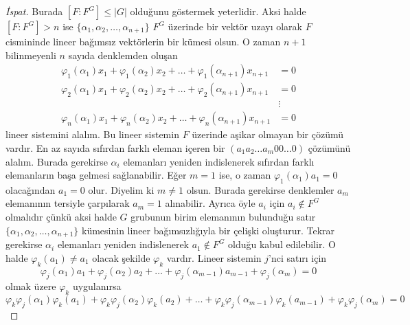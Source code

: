 \documentclass[draft]{article}
\theoremstyle{definition}
\theoremstyle{remark}
\newcommand{\envert}[1]{\left\lvert#1\right\rvert}
\let\abs=\envert
\begin{document}
    		\begin{proof}[İspat]
    	        Burada $[F : F^G] \leq \abs{G}$ olduğunu göstermek yeterlidir. Aksi halde $[F : F^G] > n$ ise $\{\alpha_1, \alpha_2, \dots, \alpha_{n + 1}\}$ $F^G$ üzerinde bir vektör uzayı olarak $F$ cismininde lineer bağımsız vektörlerin bir kümesi olsun. O zaman $n + 1$ bilinmeyenli $n$ sayıda denklemden oluşan
    	        \begin{align*}
    	            \varphi_1(\alpha_1)x_1 + \varphi_1(\alpha_2)x_2 + \dots + \varphi_1(\alpha_{n + 1})x_{n + 1} &= 0\\
    	            \varphi_2(\alpha_1)x_1 + \varphi_2(\alpha_2)x_2 + \dots + \varphi_2(\alpha_{n + 1})x_{n + 1} &= 0\\
    	            &\vdots\\
    	            \varphi_n(\alpha_1)x_1 + \varphi_n(\alpha_2)x_2 + \dots + \varphi_n(\alpha_{n + 1})x_{n + 1} &= 0
    	        \end{align*}
    	        lineer sistemini alalım. Bu lineer sistemin $F$ üzerinde aşikar olmayan bir çözümü vardır. En az sayıda sıfırdan farklı eleman içeren bir $(a_1 a_2 \dots a_m 0 0 \dots 0)$ çözümünü alalım. Burada gerekirse $\alpha_i$ elemanları yeniden indislenerek sıfırdan farklı elemanların başa gelmesi sağlanabilir. Eğer $m = 1$ ise, o zaman $\varphi_1(\alpha_1)a_1 = 0$ olacağından $a_1 = 0$ olur. Diyelim ki $m \neq 1$ olsun. Burada gerekirse denklemler $a_m$ elemanının tersiyle çarpılarak $a_m = 1$ alınabilir. Ayrıca öyle $a_i$ için $a_i \notin F^G$ olmalıdır çünkü aksi halde $G$ grubunun birim elemanının bulunduğu satır $\{\alpha_1, \alpha_2, \dots, \alpha_{n + 1}\}$ kümesinin lineer bağımsızlığıyla bir çelişki oluşturur. Tekrar gerekirse $\alpha_i$ elemanları yeniden indislenerek $a_1 \notin F^G$ olduğu kabul edilebilir. O halde $\varphi_k(a_1) \neq a_1$ olacak şekilde $\varphi_k$ vardır. Lineer sistemin $j$'nci satırı için
    	        \begin{equation*}
    	            \varphi_j(\alpha_1)a_1 + \varphi_j(\alpha_2)a_2 + \dots + \varphi_j(\alpha_{m - 1})a_{m - 1} + \varphi_j(\alpha_m) = 0
    	        \end{equation*}
    	        olmak üzere $\varphi_k$ uygulanırsa
    	        \begin{equation*}
    	            \varphi_k\varphi_j(\alpha_1)\varphi_k(a_1) + \varphi_k\varphi_j(\alpha_2)\varphi_k(a_2) + \dots + \varphi_k\varphi_j(\alpha_{m - 1})\varphi_k(a_{m - 1}) + \varphi_k\varphi_j(\alpha_m) = 0
    	        \end{equation*}

\end{proof}
\end{document}
